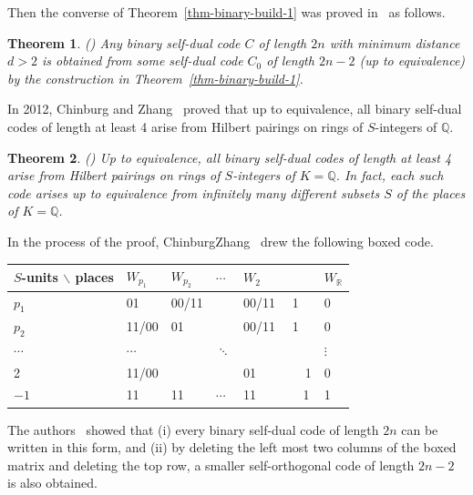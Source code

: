 \documentclass[12pt]{article}
\newtheorem{theorem}{Theorem}[section]
\begin{document}
Then the converse of Theorem~\ref{thm-binary-build-1} was proved in~\cite{Kim2001} as follows.

\begin{theorem} (\cite[Theorem 2]{Kim2001})  \label{thm-binary-build-2}
 Any binary self-dual code $C$ of length $2n$ with minimum distance $d>2$ is obtained from some self-dual code $C_0$ of length
$2n-2$ (up to equivalence) by the construction in Theorem~\ref{thm-binary-build-1}.
\end{theorem}

In 2012, Chinburg and Zhang~\cite{ChinburgZhang} proved that up to equivalence, all binary self-dual codes of length at least 4 arise from Hilbert pairings on rings of $S$-integers of $\mathbb Q$.

\begin{theorem}(\cite[Theorem 1.5]{ChinburgZhang})  \label{thm-binary-hilbert-2}
Up to equivalence, all binary self-dual codes of length at least 4 arise from Hilbert pairings on rings of $S$-integers of $K= \mathbb Q$. In fact, each such code arises up to equivalence from infinitely many different subsets $S$ of the places of $K=\mathbb Q$.
\end{theorem}

In the process of the proof, ChinburgZhang~\cite{ChinburgZhang} drew the following boxed code.

\begin{center}
\begin{tabular}{|l|lllll|}
\toprule
$S$-units $\backslash$  places & $W_{p_1}$  & $W_{p_2}$ & $\cdots$ & $W_2$  & $W_{\mathbb R}$ \\
\midrule
$p_1$  & 01   & 00/11  &  & 00/11 ~~1  &  0 \\
$p_2$  & 11/00   & 01  &  & 00/11 ~~1  &  0 \\
$\cdots$ & $\cdots$ &   &  $\ddots$ &   & $\vdots$ \\
2  & 11/00   &   &   & 01 ~~~~~~~1  &  0 \\
$-1$ & 11      & 11 & $\cdots$ & 11 ~~~~~~ 1 &  1 \\
\bottomrule
\end{tabular}
\end{center}

The authors~\cite{ChinburgZhang} showed that (i) every binary self-dual code of length $2n$ can be written in this form, and (ii) by deleting the left most two columns of the boxed matrix and deleting the top row, a smaller self-orthogonal code of length $2n-2$ is also obtained.
\end{document}

